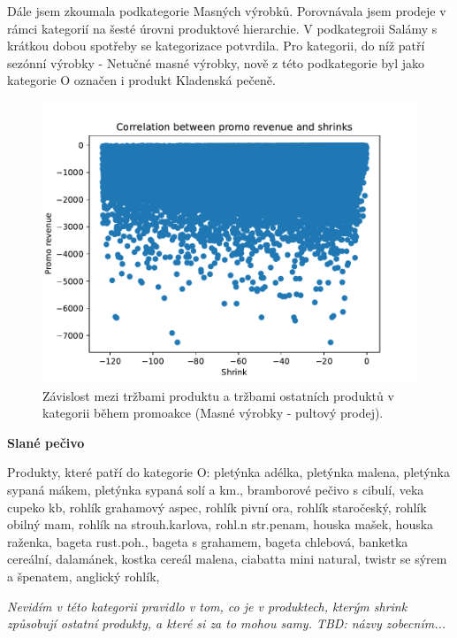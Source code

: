 Dále jsem zkoumala podkategorie Masných výrobků. Porovnávala jsem prodeje v rámci kategorií na šesté úrovni produktové hierarchie. V podkategroii Salámy s krátkou dobou spotřeby se kategorizace potvrdila. Pro kategorii, do níž patří sezónní výrobky - Netučné masné výrobky, nově z této podkategorie byl jako kategorie O označen i produkt Kladenská pečeně.

\begin{figure}[hbtp!]
    \centering
    \captionsetup{justification=centering}
    \includegraphics[width=\textwidth]{obrazky/grafy/categorization_charts/categorization_charts_L4_PROC. MEAT SERVICE.pdf}
    \caption{Závislost mezi tržbami produktu a tržbami ostatních produktů v kategorii během promoakce (Masné výrobky - pultový prodej).}
    \label{obr:ctg:g:kategorizace1}
\end{figure}

\textbf{Slané pečivo}

Produkty, které patří do kategorie O:
pletýnka adélka, pletýnka malena, pletýnka sypaná mákem, pletýnka sypaná solí a km., bramborové pečivo s cibulí, veka cupeko kb, rohlík grahamový aspec, rohlík pivní ora, rohlík staročeský, rohlík obilný mam, rohlík na strouh.karlova, rohl.n str.penam, houska mašek, houska raženka, bageta rust.poh., bageta s grahamem, bageta chlebová, banketka cereální, dalamánek, kostka cereál malena, ciabatta mini natural, twistr se sýrem a špenatem, anglický rohlík, 

\emph{Nevidím v této kategorii pravidlo v tom, co je v produktech, kterým shrink způsobují ostatní produkty, a které si za to mohou samy. TBD: názvy zobecním...}

